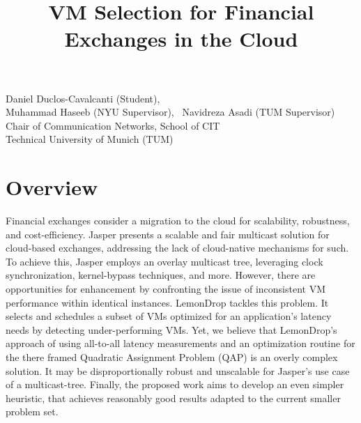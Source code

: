 \documentclass{article}
\title{VM Selection for Financial Exchanges in the Cloud}
\makeatletter
\renewcommand{\maketitle}{%
    \thispagestyle{fancy}%
    \begin{center}
        \Large\bfseries\@title
    \end{center}
    \vspace{-0.25cm}
    \begin{center}
        Daniel Duclos-Cavalcanti (Student),
        \\
        Muhammad Haseeb (NYU Supervisor),
        ~Navidreza Asadi (TUM Supervisor) 
        \\Chair of Communication Networks, School of CIT
        \\Technical University of Munich (TUM)
    \end{center}
}
\makeatother
\begin{document}
\maketitle

\section{Overview}


Financial exchanges consider a migration to the cloud for scalability, robustness, and cost-efficiency.
Jasper \cite{haseeb2024jasper} presents a scalable and fair multicast solution for cloud-based exchanges, 
addressing the lack of cloud-native mechanisms for such. 
To achieve this, Jasper employs an overlay multicast tree, leveraging clock synchronization, kernel-bypass techniques, 
and more.
However, there are opportunities for enhancement by confronting the issue of inconsistent VM performance 
within identical instances. LemonDrop \cite{sachidananda2022scheduling} tackles this problem.
It selects and schedules a subset of VMs optimized for an application's latency needs by 
detecting under-performing VMs. 
Yet, we believe that LemonDrop's approach of using all-to-all latency measurements and an optimization routine 
for the there framed Quadratic Assignment Problem (QAP) is an overly complex solution. 
It may be disproportionally robust and  unscalable for Jasper's use case of a multicast-tree.
Finally, the proposed work aims to develop an even simpler heuristic, that achieves reasonably good results 
adapted to the current smaller problem set.
\end{document}
